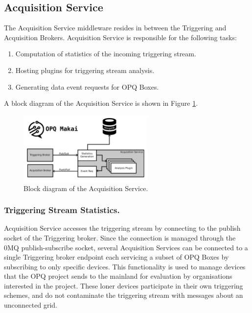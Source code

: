 \subsection{Acquisition Service}\label{subsec:acquisition-service}

The Acquisition Service middleware resides in between the Triggering and Acquisition Brokers.
Acquisition Service is responsible for the following tasks:
\begin{enumerate}
	\item Computation of statistics of the incoming triggering stream.
	\item Hosting plugins for triggering stream analysis.
	\item Generating data event requests for OPQ Boxes.
\end{enumerate}
A block diagram of the Acquisition Service is shown in Figure \ref{fig:opq:makai_aqs}.
\begin{figure}[h]
	\begin{center}
		\includegraphics[width=0.6\textwidth]{img/makai_aqs.pdf}
	\end{center}
	\caption{Block diagram of the Acquisition Service.}
	\label{fig:opq:makai_aqs}
\end{figure}

\subsubsection{Triggering Stream Statistics.}

Acquisition Service accesses the triggering stream by connecting to the publish socket of the Triggering broker.
Since the connection is managed through the 0MQ publish-subscribe socket, several Acquisition Services can be connected to a single Triggering broker endpoint each servicing a subset of OPQ Boxes by subscribing to only specific devices.
This functionality is used to manage devices that the OPQ project sends to the mainland for evaluation by organisations interested in the project.
These loner devices participate in their own triggering schemes, and do not contaminate the triggering stream with messages about an unconnected grid.

